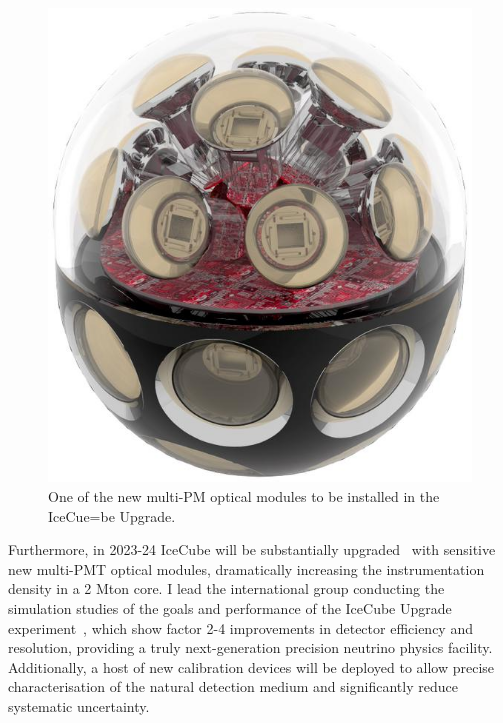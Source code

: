 \documentclass[a4paper,11pt]{article}
\begin{document}
\begin{figure} %
    \centering
	\includegraphics[width=1.\linewidth]{images/mdom.jpg}
	\caption{One of the new multi-PM optical modules to be installed in the IceCue=be Upgrade.}
	\label{fig:atmo_osc}
\end{figure}


Furthermore, in 2023-24 IceCube will be substantially upgraded~\cite{IceCubeUpgrade_ICRC2019} with sensitive new multi-PMT optical modules, dramatically increasing the instrumentation density in a 2 Mton core. I lead the international group conducting the simulation studies of the goals and performance of the IceCube Upgrade experiment~\cite{IceCubeUpgrade_ICRC2019, NuFactProceedings}, which show factor 2-4 improvements in detector efficiency and resolution, providing a truly next-generation precision neutrino physics facility. Additionally, a host of new calibration devices will be deployed to allow precise characterisation of the natural detection medium and significantly reduce systematic uncertainty.\\
\end{document}
